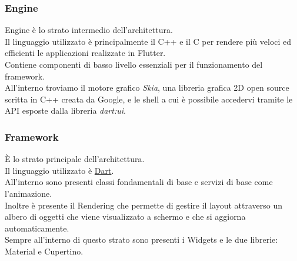 \subsubsection{Engine}
Engine è lo strato intermedio dell'architettura.\\
Il linguaggio utilizzato è principalmente il C++ e il C per rendere più veloci ed efficienti le applicazioni realizzate in Flutter.\\
Contiene componenti di basso livello essenziali per il funzionamento del framework.\\
All'interno troviamo il motore grafico \textit{Skia}, una libreria grafica 2D open source scritta in C++ creata da Google, e le shell a cui è possibile accedervi tramite le API esposte dalla libreria \textit{dart:ui}.

\subsubsection{Framework}
È lo strato principale dell'architettura.\\
Il linguaggio utilizzato è \hyperref[sec:Dart]{Dart}.\\
All'interno sono presenti classi fondamentali di base e servizi di base come l'animazione.\\
Inoltre è presente il Rendering che permette di gestire il layout attraverso un albero di oggetti che viene visualizzato
a schermo e che si aggiorna automaticamente.\\
Sempre all'interno di questo strato sono presenti i Widgets e le due librerie: Material e Cupertino.

\newpage

